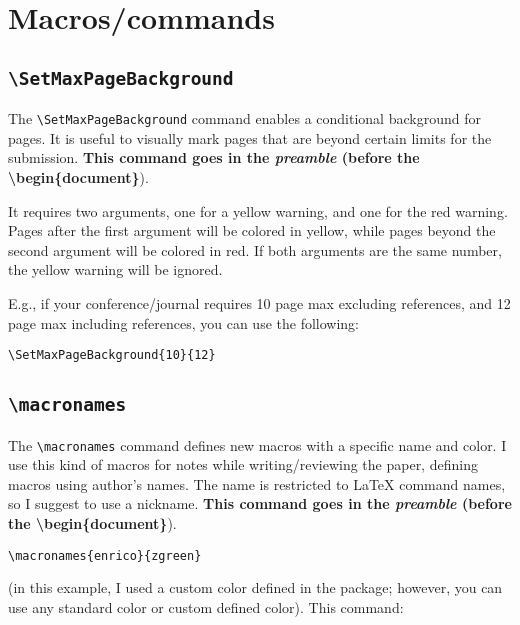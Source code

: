 \documentclass[a4paper]{article}
\newcommand\B[1]{\texttt{\textbackslash #1}}
\begin{document}
\section{Macros/commands}

\subsection{\B{SetMaxPageBackground}}

The \B{SetMaxPageBackground} command enables a conditional background for pages. It is useful to visually mark pages that are beyond certain limits for the submission. \textbf{This command goes in the \textit{preamble} (before the \textbackslash begin\{document\}}).

It requires two arguments, one for a yellow warning, and one for the red warning. Pages after the first argument will be colored in yellow, while pages beyond the second argument will be colored in red. If both arguments are the same number, the yellow warning will be ignored.

E.g., if your conference/journal requires 10 page max excluding references, and 12 page max including references, you can use the following:

\begin{verbatim}
\SetMaxPageBackground{10}{12}
\end{verbatim}

\subsection{\B{macronames}}

The \B{macronames} command defines new macros with a specific name and color. I use this kind of macros for notes while writing/reviewing the paper, defining macros using author's names. The name is restricted to LaTeX command names, so I suggest to use a nickname. \textbf{This command goes in the \textit{preamble} (before the \textbackslash begin\{document\}}).

\begin{verbatim}
\macronames{enrico}{zgreen}
\end{verbatim}

(in this example, I used a custom color defined in the package; however, you can use any standard color or custom defined color). This command:
\end{document}

